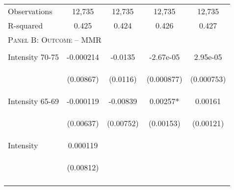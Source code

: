 \begin{subtables}
\begin{table}[htpb!]
\begin{center}
\begin{tabular}{p{5cm}cccc}
Observations&12,735&12,735&12,735&12,735\\ 
R-squared&0.425&0.424&0.426&0.427\\ \midrule 
\multicolumn{5}{l}{\textsc{Panel B: Outcome -- MMR}}\\ 
\begin{footnotesize}\end{footnotesize}&\begin{footnotesize}\end{footnotesize}&\begin{footnotesize}\end{footnotesize}&\begin{footnotesize}\end{footnotesize}\\ 
Intensity 70-75&-0.000214&-0.0135&-2.67e-05&2.95e-05\\ 
&\begin{footnotesize}(0.00867)\end{footnotesize}&\begin{footnotesize}(0.0116)\end{footnotesize}&\begin{footnotesize}(0.000877)\end{footnotesize}&\begin{footnotesize}(0.000753)\end{footnotesize}\\ 
Intensity 65-69&-0.000119&-0.00839&0.00257*&0.00161\\ 
&\begin{footnotesize}(0.00637)\end{footnotesize}&\begin{footnotesize}(0.00752)\end{footnotesize}&\begin{footnotesize}(0.00153)\end{footnotesize}&\begin{footnotesize}(0.00121)\end{footnotesize}\\ 
Intensity      &0.000119&&&\\ 
&\begin{footnotesize}(0.00812)\end{footnotesize}&&\\ 
\begin{footnotesize}\end{footnotesize}&\begin{footnotesize}\end{footnotesize}&\begin{footnotesize}\end{footnotesize}&\begin{footnotesize}\end{footnotesize}\\ 

\end{tabular}
\end{center}
\end{table}
\end{subtables}
